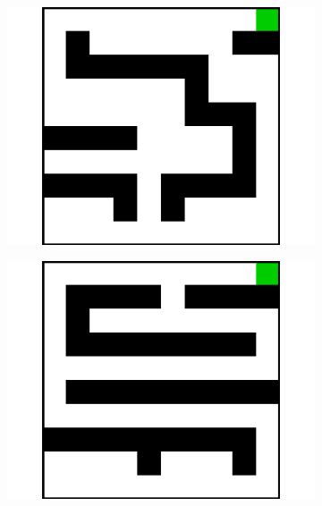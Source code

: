 \documentclass{article}
\begin{document}
\begin{figure}[t]
\begin{subfigure}[t]{0.18\textwidth}
    \includegraphics[width=\textwidth]{images/maze/maze2.pdf}
    \caption{}
  \end{subfigure}
  \begin{subfigure}[t]{0.18\textwidth}
    \includegraphics[width=\textwidth]{images/maze/maze3.pdf}
    \caption{}
  \end{subfigure}
  \begin{subfigure}[t]{0.18\textwidth}

\end{subfigure}
\end{figure}
\end{document}
